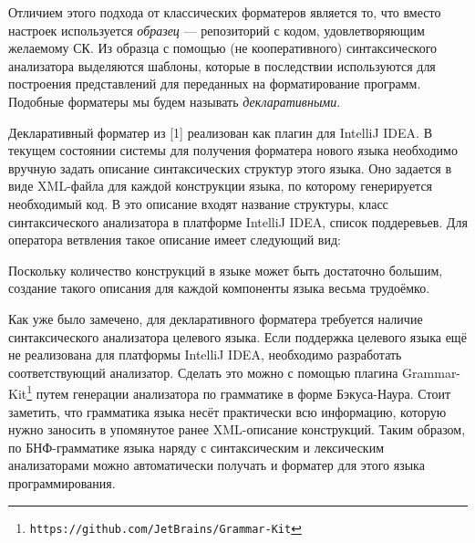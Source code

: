 \documentclass[conference]{IEEEtran}
\begin{document}
Отличием этого подхода от классических форматеров является то, что вместо
настроек используется \emph{образец} --- репозиторий с кодом, 
удовлетворяющим желаемому СК. Из образца с помощью (не кооперативного)
синтаксического анализатора выделяются шаблоны, которые в последствии
используются для построения представлений для переданных на форматирование
программ.
Подобные форматеры мы будем называть \emph{декларативными}.


Декларативный форматер из [1] %
реализован как плагин для
IntelliJ IDEA. В текущем состоянии системы для 
получения форматера нового языка необходимо вручную задать описание
синтаксических структур этого языка.
Оно задается в виде XML-файла для каждой конструкции языка,
по которому генерируется необходимый код.
В это описание входят название структуры, класс синтаксического анализатора
в платформе IntelliJ IDEA, список поддеревьев.
Для оператора ветвления такое описание имеет следующий вид:



\noindent
Поскольку количество конструкций в языке может быть достаточно большим,
создание такого описания для каждой компоненты языка весьма трудоёмко.


Как уже было замечено, для декларативного форматера требуется наличие
синтаксического анализатора целевого языка.
Если поддержка целевого языка ещё не реализована для платформы
IntelliJ IDEA, необходимо разработать соответствующий анализатор.
Сделать это можно с помощью плагина
Grammar-Kit\footnote{\texttt{https://github.com/JetBrains/Grammar-Kit}}
путем генерации анализатора по грамматике в форме Бэкуса-Наура.
Стоит заметить, что грамматика языка несёт практически всю информацию,
которую нужно заносить в упомянутое ранее XML-описание конструкций.
Таким образом, по БНФ-грамматике языка наряду с синтаксическим и
лексическим анализаторами можно автоматически получать и форматер
для этого языка программирования.
\end{document}
